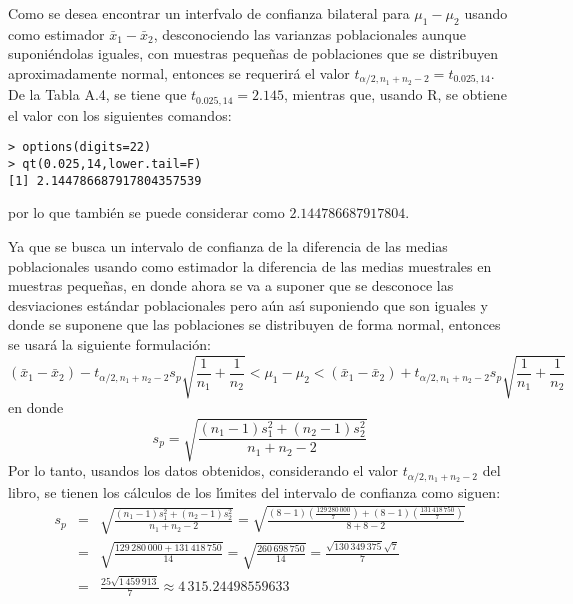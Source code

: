 \begin{solucion}
 Como se desea encontrar un interfvalo de confianza bilateral para $\mu_1 - \mu_2$ usando como estimador $\bar{x}_1 - \bar{x}_2$, desconociendo las varianzas poblacionales aunque suponi\'endolas iguales, con muestras peque\~nas de poblaciones que se distribuyen aproximadamente normal, entonces se requerir\'a el valor $t_{\alpha/2,n_1+n_2 - 2} = t_{0.025,14}$. De la Tabla A.4, se tiene que $t_{0.025,14} = 2.145$, mientras que, usando R, se obtiene el valor con los siguientes comandos:
 \begin{verbatim}
> options(digits=22)
> qt(0.025,14,lower.tail=F)
[1] 2.144786687917804357539
 \end{verbatim}
 \vspace{-0.5cm}
 por lo que tambi\'en se puede considerar como $2.144786687917804$.
 \par 
 Ya que se busca un intervalo de confianza de la diferencia de las medias poblacionales usando como estimador la diferencia de las medias muestrales en muestras peque\~nas, en donde ahora se va a suponer que se desconoce las desviaciones est\'andar poblacionales pero a\'un as\'{\i} suponiendo que son iguales y donde se suponene que las poblaciones se distribuyen de forma normal, entonces se usar\'a la siguiente formulaci\'on:
 \begin{equation*}
  \left( \bar{x}_1 - \bar{x}_2 \right) - t_{\alpha/2,n_1 +n_2 - 2} s_p \sqrt{\frac{1}{n_1} + \frac{1}{n_2}} < \mu_1 - \mu_2 < \left( \bar{x}_1 - \bar{x}_2 \right) + t_{\alpha/2,n_1 +n_2 - 2} s_p \sqrt{\frac{1}{n_1} + \frac{1}{n_2}}
 \end{equation*}
 en donde
 \begin{equation*}
  s_p = \sqrt{\frac{\left( n_1 - 1 \right)s_1^2 + \left( n_2 - 1 \right)s_2^2}{n_1 + n_2 - 2}}
 \end{equation*}
 Por lo tanto, usandos los datos obtenidos, considerando el valor $t_{\alpha/2,n_1+n_2-2}$ del libro, se tienen los c\'alculos de los l\'{\i}mites del intervalo de confianza como siguen:
 \begin{eqnarray*}
  s_p & = & \sqrt{\frac{\left( n_1 - 1 \right)s_1^2 + \left( n_2 - 1 \right)s_2^2}{n_1 + n_2 - 2}} = \sqrt{\frac{(8-1)\left( \frac{129\,280\,000}{7} \right) + (8-1)\left( \frac{131\,418\,750}{7} \right) }{8+8-2}} \\
  & = & \sqrt{\frac{129\,280\,000 + 131\,418\,750}{14}} = \sqrt{\frac{260\,698\,750}{14}} = \frac{\sqrt{130\,349\,375}\sqrt{7}}{7} \\
  & = & \frac{25\sqrt{1\,459\,913}}{7} \approx 4\,315.24498559633
 \end{eqnarray*}

\end{solucion}
